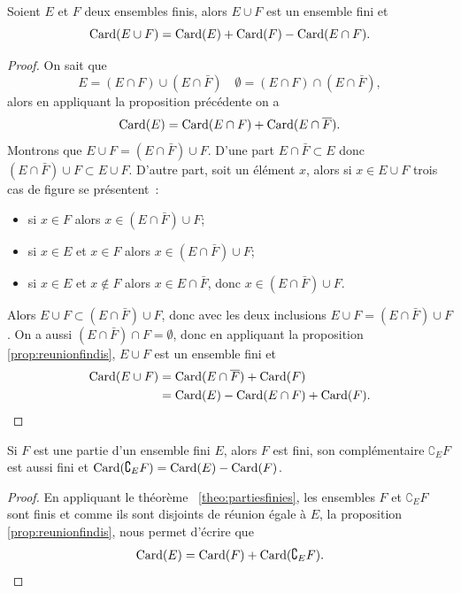 \begin{prop}
  Soient \(E\) et \(F\) deux ensembles finis, alors \(E\cup F\) est un ensemble 
  fini et
  \begin{equation}
    \operatorname{Card}(E\cup F)=\operatorname{Card}(E)+\operatorname{Card}(F)-\operatorname{Card}(E\cap F).
  \end{equation}
\end{prop}

\begin{proof}
  On sait que
  \begin{equation}
    E = (E\cap F)\cup (E\cap \bar{F}) \quad \emptyset = (E\cap F)\cap (E\cap 
    \bar{F}),
  \end{equation} alors en appliquant la proposition précédente on a
  \begin{equation}
    \operatorname{Card}(E)=\operatorname{Card}(E\cap F)+\operatorname{Card}(E\cap \overline{F}).
  \end{equation}
  Montrons que \(E\cup F =(E\cap \bar{F}) \cup F\). D'une part \(E \cap \bar{F} 
  \subset E\) donc \((E\cap \bar{F}) \cup F \subset E\cup F\). D'autre part, 
  soit un élément \(x\), alors si \(x \in E \cup F\) trois cas de figure se 
  présentent~:
  \begin{itemize}
    \item si \(x\in F\) alors \(x \in (E\cap \bar{F}) \cup F\);
    \item si \(x \in E\) et \(x \in F\) alors \(x \in (E\cap \bar{F}) \cup F\);
    \item si \(x \in E\) et \(x \notin F\) alors \(x \in E\cap \bar{F}\), donc 
      \(x \in (E\cap \bar{F}) \cup F\).
  \end{itemize}
  Alors \(E\cup F \subset (E \cap \bar{F})\cup F\), donc avec les deux 
  inclusions \(E\cup F =(E\cap \bar{F}) \cup F\). On a aussi \((E\cap 
  \bar{F})\cap F = \emptyset\), donc en appliquant la proposition~
  \ref{prop:reunionfindis}, \(E\cup F\) est un ensemble fini et
  \begin{align}
    \operatorname{Card}(E\cup F)&=\operatorname{Card}(E\cap \overline{F})+\operatorname{Card}(F)\\ &=\operatorname{Card}(E) - \operatorname{Card}(E\cap 
    F)+\operatorname{Card}(F).
  \end{align}
\end{proof}

\begin{prop}
  Si \(F\) est une partie d'un ensemble fini \(E\), alors \(F\) est fini, son 
  complémentaire \(\complement_E F\) est aussi fini et \(\operatorname{Card}(\complement_E 
  F)=\operatorname{Card}(E)-\operatorname{Card}(F)\).
\end{prop}

\begin{proof}
  En appliquant le théorème~
  \ref{theo:partiesfinies}, les ensembles \(F\) et \(\complement_E F\) sont 
  finis et comme ils sont disjoints de réunion égale à \(E\), la proposition~
  \ref{prop:reunionfindis}, nous permet d'écrire que
  \begin{equation}
    \operatorname{Card}(E)=\operatorname{Card}(F)+\operatorname{Card}(\complement_E F).
  \end{equation}
\end{proof}

